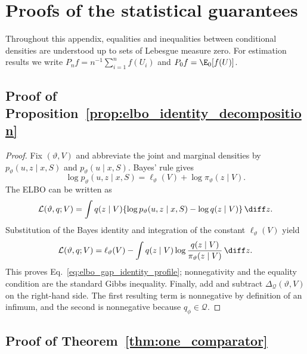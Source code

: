 \section{Proofs of the statistical guarantees}
\label{app:statistical_proofs}

Throughout this appendix, equalities and inequalities between conditional
densities are understood up to sets of Lebesgue measure zero.  For estimation
results we write $P_nf=n^{-1}\sum_{i=1}^nf(U_i)$ and
$P_0f=\E_0[f(U)]$.

\subsection{Proof of Proposition~\ref{prop:elbo_identity_decomposition}}

\begin{proof}
Fix $(\vartheta,V)$ and abbreviate the joint and marginal densities by
$p_\vartheta(u,z\mid x,S)$ and $p_\vartheta(u\mid x,S)$.  Bayes' rule gives
\[
 \log p_\vartheta(u,z\mid x,S)
 =\ell_\vartheta(V)+\log\pi_\vartheta(z\mid V).
\]
The ELBO can be written as
\[
 \mathcal L(\vartheta,q;V)
 =\int q(z\mid V)
 \{\log p_\vartheta(u,z\mid x,S)-\log q(z\mid V)\}\,\diff z.
\]
Substitution of the Bayes identity and integration of the constant
$\ell_\vartheta(V)$ yield
\[
 \mathcal L(\vartheta,q;V)
 =\ell_\vartheta(V)-
 \int q(z\mid V)\log\frac{q(z\mid V)}{\pi_\vartheta(z\mid V)}\,\diff z.
\]
This proves Eq.~\eqref{eq:elbo_gap_identity_profile}; nonnegativity and the
equality condition are the standard Gibbs inequality.  Finally, add and
subtract $\Delta_{\mathcal Q}(\vartheta,V)$ on the right-hand side.  The
first resulting term is nonnegative by definition of an infimum, and the
second is nonnegative because $q_\phi\in\mathcal Q$.
\end{proof}

\subsection{Proof of Theorem~\ref{thm:one_comparator}}

